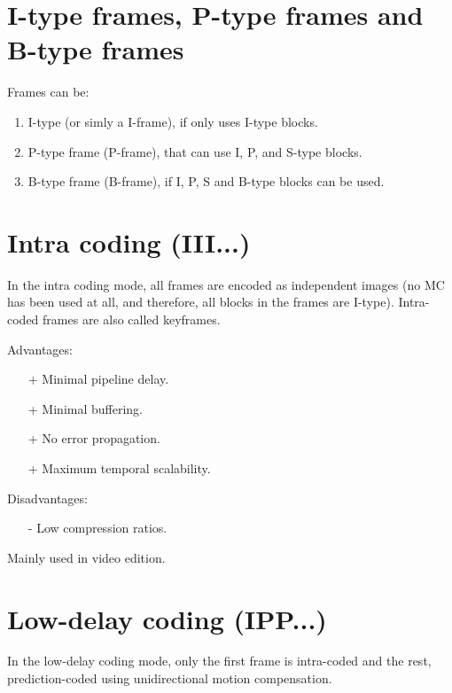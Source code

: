 \section{I-type frames, P-type frames and B-type frames}

Frames can be:

\begin{enumerate}
\item I-type (or simly a I-frame), if only uses I-type blocks.
\item P-type frame (P-frame), that can use I, P, and S-type blocks.
\item B-type frame (B-frame), if I, P, S and B-type blocks can be
  used.
\end{enumerate}

\section{Intra coding (III...)}

In the intra coding mode, all frames are encoded as independent
images (no MC has been used at all, and therefore, all blocks in the
frames are I-type). Intra-coded frames are also called keyframes.

Advantages:
\begin{itemize}
\item [+] Minimal pipeline delay.
\item [+] Minimal buffering.
\item [+] No error propagation.
\item [+] Maximum temporal scalability.
\end{itemize}

Disadvantages:
\begin{enumerate}
\item [-] Low compression ratios.
\end{enumerate}

Mainly used in video edition.

\section{Low-delay coding (IPP...)}

In the low-delay coding mode, only the first frame is intra-coded and
the rest, prediction-coded using unidirectional motion
compensation.

